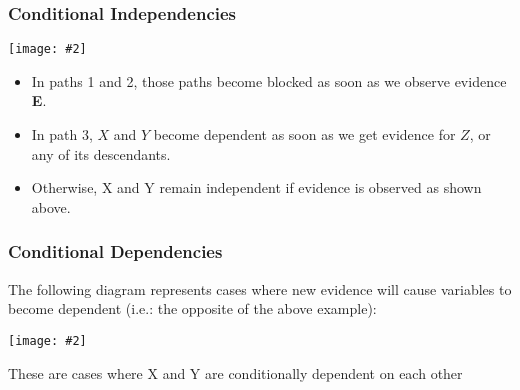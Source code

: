 \documentclass{article}
\newcommand{\centerfig}[2]{\begin{center}\texttt{[image: \#2]}\end{center}}
\begin{document}
\subsubsection*{Conditional Independencies}
\centerfig{0.9}{BN-6}
\begin{itemize}
	\item In paths 1 and 2, those paths become blocked as soon as we observe evidence \textbf{E}.
	\item In path 3, $ X $ and $ Y $ become dependent as soon as we get evidence for $ Z $, or any of its descendants.
	\item Otherwise, X and Y remain independent if evidence is observed as shown above.
\end{itemize}
\subsubsection*{Conditional Dependencies}
The following diagram represents cases where new evidence will cause variables to become dependent (i.e.: the opposite of the above example):
\centerfig{0.9}{BN-7}
These are cases where X and Y are conditionally dependent on each other\\
\\
\end{document}
